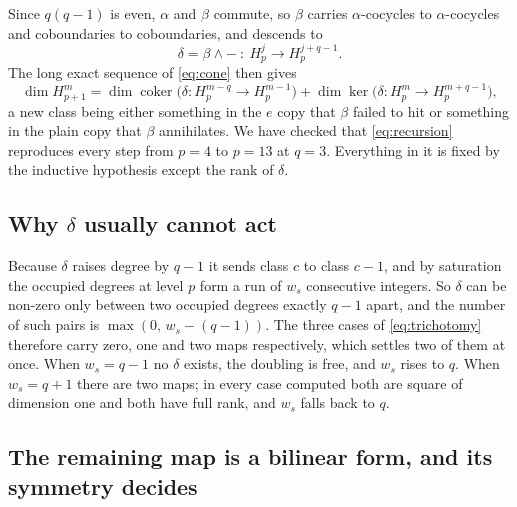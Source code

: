 \documentclass[10pt]{article}
\begin{document}
Since $q(q-1)$ is even, $\alpha$ and $\beta$ commute, so $\beta$ carries $\alpha$-cocycles to $\alpha$-cocycles
and coboundaries to coboundaries, and descends to
\begin{equation}
\delta=\beta\wedge-\ :\ H^j_p\longrightarrow H^{j+q-1}_p .
\end{equation}
The long exact sequence of \eqref{eq:cone} then gives
\begin{equation}
\dim H^m_{p+1}=\dim\operatorname{coker}\big(\delta:H^{m-q}_p\to H^{m-1}_p\big)
+\dim\ker\big(\delta:H^{m}_p\to H^{m+q-1}_p\big),
\label{eq:recursion}
\end{equation}
a new class being either something in the $e$ copy that $\beta$ failed to hit or something in the plain copy
that $\beta$ annihilates. We have checked that \eqref{eq:recursion} reproduces every step from $p=4$ to $p=13$
at $q=3$. Everything in it is fixed by the inductive hypothesis except the rank of $\delta$.

\subsection{Why $\delta$ usually cannot act}

Because $\delta$ raises degree by $q-1$ it sends class $c$ to class $c-1$, and by saturation the occupied
degrees at level $p$ form a run of $w_s$ consecutive integers. So $\delta$ can be non-zero only between two
occupied degrees exactly $q-1$ apart, and the number of such pairs is $\max(0,\,w_s-(q-1))$. The three cases of
\eqref{eq:trichotomy} therefore carry zero, one and two maps respectively, which settles two of them at once.
When $w_s=q-1$ no $\delta$ exists, the doubling is free, and $w_s$ rises to $q$. When $w_s=q+1$ there are two
maps; in every case computed both are square of dimension one and both have full rank, and $w_s$ falls back
to $q$.

\subsection{The remaining map is a bilinear form, and its symmetry decides}
\end{document}
